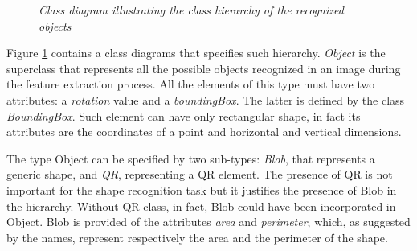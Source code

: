 		\begin{figure}[h]
		  \begin{center} 
		  \end{center} 
		  \caption{\textit{Class diagram illustrating the class hierarchy of the recognized objects}}  
		  \label{fig:HierarchyDesign}
	 	\end{figure}

		Figure \ref{fig:HierarchyDesign} contains a class diagrams that specifies such hierarchy. 
		\emph{Object} is the superclass that represents all the possible objects recognized in an image during the feature extraction process. 
		All the elements of this type must have two attributes: a \emph{rotation} value and a \emph{boundingBox}. 
		The latter is defined by the class \emph{BoundingBox}. Such element can have only rectangular shape, in fact its attributes are the coordinates of a point and horizontal and vertical dimensions.


		The type Object can be specified by two sub-types: \emph{Blob}, that represents a generic shape, and \emph{QR}, representing a \mbox{QR} element. The presence of \mbox{QR} is not important for the shape recognition task but it justifies the presence of Blob in the hierarchy. Without \mbox{QR} class, in fact, Blob could have been incorporated in Object.
		Blob is provided of the attributes \emph{area} and \emph{perimeter}, which, as suggested by the names, represent respectively the area and the perimeter of the shape.
	

